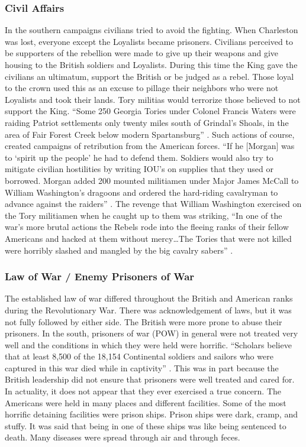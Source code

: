 \subsubsection{Civil Affairs}

In the southern campaigns civilians tried to avoid the fighting. When Charleston
was lost, everyone except the Loyalists became prisoners.  Civilians perceived
to be supporters of the rebellion were made to give up their weapons and give
housing to the British soldiers and Loyalists.  During this time the King gave
the civilians an ultimatum, support the British or be judged as a rebel. Those
loyal to the crown used this as an excuse to pillage their neighbors who were
not Loyalists and took their lands. Tory militias would terrorize those believed
to not support the King.  “Some 250 Georgia Tories under Colonel Francis Waters
were raiding Patriot settlements only twenty miles south of Grindal’s Shoals, in
the area of Fair Forest Creek below modern Spartansburg”
\cite[p.302]{buchanan_road_1997}.
Such actions of course, created campaigns of retribution from the American
forces.  “If he [Morgan] was to ‘spirit up the people’ he had to defend them.
Soldiers would also try to mitigate civilian hostilities by writing IOU’s on
supplies that they used or borrowed. Morgan added 200 mounted militiamen under
Major James McCall to William Washington’s dragoons and ordered the hard-riding
cavalryman to advance against the raiders” \cite[p.302]{buchanan_road_1997}.  The revenge that
William Washington exercised on the Tory militiamen when he caught up to them
was striking, “In one of the war’s more brutal actions the Rebels rode into the
fleeing ranks of their fellow Americans and hacked at them without mercy…The
Tories that were not killed were horribly slashed and mangled by the big cavalry
sabers” \cite[p.302]{buchanan_road_1997}.  

\subsubsection{Law of War / Enemy Prisoners of War}

The established law of war differed throughout the British and American ranks
during the Revolutionary War. There was acknowledgement of laws, but it was not
fully followed by either side. The British were more prone to abuse their
prisoners. In the south, prisoners of war (POW) in general were not treated very
well and the conditions in which they were held were horrific. “Scholars believe
that at least 8,500 of the 18,154 Continental soldiers and sailors who were
captured in this war died while in captivity” \cite[p.428]{Ferlin}.  This was in
part because the British leadership did not ensure that prisoners were well
treated and cared for.  In actuality, it does not appear that they ever
exercised a true concern. The Americans were held in many places and different
facilities. Some of the most horrific detaining facilities were prison ships.
Prison ships were dark, cramp, and stuffy.  It was said that being in one of
these ships was like being sentenced to death.  Many diseases were spread
through air and through feces. 

